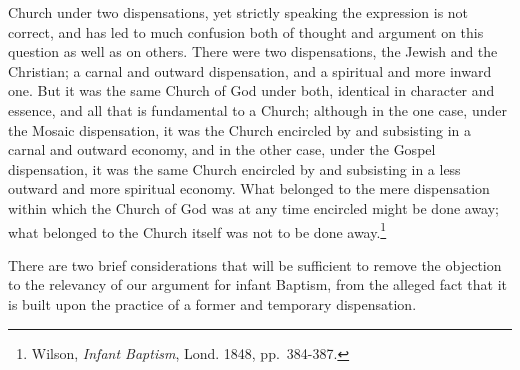 \documentclass[english,]{book}
\begin{document}
Church under two dispensations, yet strictly speaking the expression is not correct, and has led to much confusion both of thought and argument on this question as well as on others. There were two dispensations, the Jewish and the Christian; a carnal and outward dispensation, and a spiritual and more inward one. But it was the same Church of God under both, identical in character and essence, and all that is fundamental to a Church; although in the one case, under the Mosaic dispensation, it was the Church encircled by and subsisting in a carnal and outward economy, and in the other case, under the Gospel dispensation, it was the same Church encircled by and subsisting in a less outward and more spiritual economy. What belonged to the mere dispensation within which the Church of God was at any time encircled might be done away; what belonged to the Church itself was not to be done away.\footnote{Wilson, \emph{Infant Baptism}, Lond. 1848, pp.~384-387.}

There are two brief considerations that will be sufficient to remove the objection to the relevancy of our argument for infant Baptism, from the alleged fact that it is built upon the practice of a former and temporary dispensation.
\end{document}

